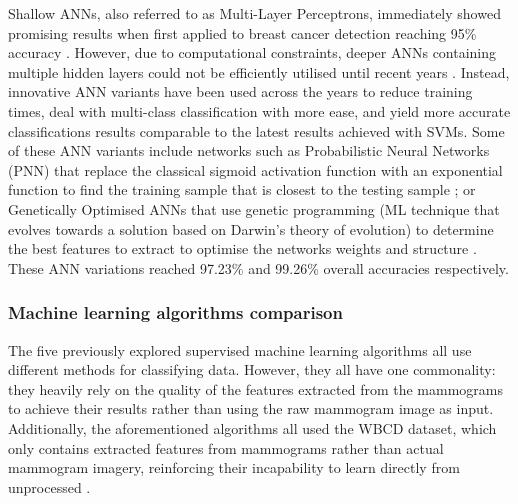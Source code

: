 Shallow ANNs, also referred to as Multi-Layer Perceptrons, immediately showed promising results when first applied to breast cancer detection reaching 95\% accuracy \citep{Wu1993}. However, due to computational constraints, deeper ANNs containing multiple hidden layers could not be efficiently utilised until recent years \citep{Litjens2017}. Instead, innovative ANN variants have been used across the years to reduce training times, deal with multi-class classification with more ease, and yield more accurate classifications results comparable to the latest results achieved with SVMs. Some of these ANN variants include networks such as Probabilistic Neural Networks (PNN) that replace the classical sigmoid activation function with an exponential function to find the training sample that is closest to the testing sample \citep{Osareh2010}; or Genetically Optimised ANNs that use genetic programming (ML technique that evolves towards a solution based on Darwin's theory of evolution) to determine the best features to extract to optimise the networks weights and structure \citep{Bhardwaj2015}. These ANN variations reached 97.23\% and 99.26\% overall accuracies respectively.



\subsubsection{Machine learning algorithms comparison}

The five previously explored supervised machine learning algorithms all use different methods for classifying data. However, they all have one commonality: they heavily rely on the quality of the features extracted from the mammograms to achieve their results rather than using the raw mammogram image as input. Additionally, the aforementioned algorithms all used the WBCD dataset, which only contains extracted features from mammograms rather than actual mammogram imagery, reinforcing their incapability to learn directly from unprocessed \citep{Wolberg1995}.\\

